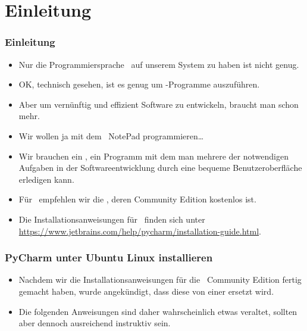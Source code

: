 \documentclass[aspectratio=169,mathserif,notheorems]{beamer}%
\subtitle{4.~PyCharm Installieren}%
\begin{document}
%
%
\startPresentation%
%
\section{Einleitung}%
%
\begin{frame}[t]%
\frametitle{Einleitung}%
\begin{itemize}%
\item Nur die Programmiersprache \python\ auf unserem System zu haben ist nicht genug.%
\item<2-> OK, technisch gesehen, ist es genug um \python-Programme auszuführen.%
\item<3-> Aber um vernünftig und effizient Software zu entwickeln, braucht man schon mehr.%
\item<4-> Wir wollen ja mit dem \microsoftWindows\ NotePad programmieren\dots%
\item<6-> Wir brauchen ein , ein Programm mit dem man mehrere der notwendigen Aufgaben in der Softwareentwicklung durch eine bequeme Benutzeroberfläche erledigen kann.%
\item<7-> Für \python\ empfehlen wir die \pycharm\cite{VHN2023HOADWP,Y2022PPADT,W2024PME} , deren Community Edition kostenlos ist.%
\item<8-> Die Installationsanweisungen für \pycharm\ finden sich unter \url{https://www.jetbrains.com/help/pycharm/installation-guide.html}.%
\end{itemize}%
%
%
\end{frame}%
%

\begin{frame}[t]%
\frametitle{PyCharm unter Ubuntu Linux installieren}%
\begin{itemize}%
\item Nachdem wir die Installationsanweisungen für die \pycharm\ Community Edition fertig gemacht haben, wurde angekündigt, dass diese von einer  ersetzt wird.%
\item<2-> Die folgenden Anweisungen sind daher wahrscheinlich etwas veraltet, sollten aber dennoch ausreichend instruktiv sein.%
\end{itemize}%
%
\end{frame}%
%
\end{document}
